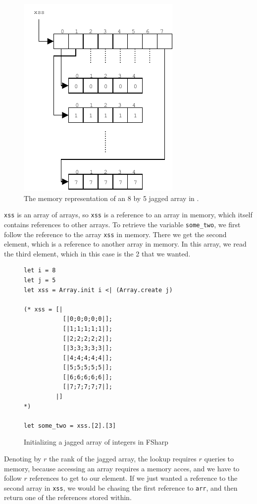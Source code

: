 \begin{figure}
  \centering
  \includegraphics[scale=2]{chapters/figs/jaggedarrays.pdf}
  \caption{The memory representation of an 8 by 5 jagged array in \csharp{}.}
  \label{fig:jaggedarraydrawing}
\end{figure}


\texttt{xss} is an array of arrays, so \texttt{xss} is a reference to an array
in memory, which itself contains references to other arrays.
To retrieve the variable \texttt{some\_two}, we first follow the reference to
the array \texttt{xss} in memory. There we get the second element, which is a
reference to another array in memory. In this array, we read the third element,
which in this case is the 2 that we wanted.

\begin{figure}[h]
  \centering
\begin{verbatim}
let i = 8
let j = 5
let xss = Array.init i <| (Array.create j) 
  
(* xss = [|
           [|0;0;0;0;0|];
           [|1;1;1;1;1|];
           [|2;2;2;2;2|];
           [|3;3;3;3;3|];
           [|4;4;4;4;4|];
           [|5;5;5;5;5|];
           [|6;6;6;6;6|];
           [|7;7;7;7;7|];
         |]
*) 

let some_two = xss.[2].[3]

\end{verbatim}
  \caption{Initializing a jagged array of integers in FSharp}
  \label{fig:jaggedarrayfsharp}
\end{figure}

Denoting by $r$ the rank of the jagged array, the lookup requires $r$ 
queries to memory, because accessing an array requires a memory acces, 
and we have to follow $r$ references to get to our element. If we just 
wanted a reference to the second array in \texttt{xss}, we would be 
chasing the first reference to \texttt{arr}, and then return one of 
the references stored within.

